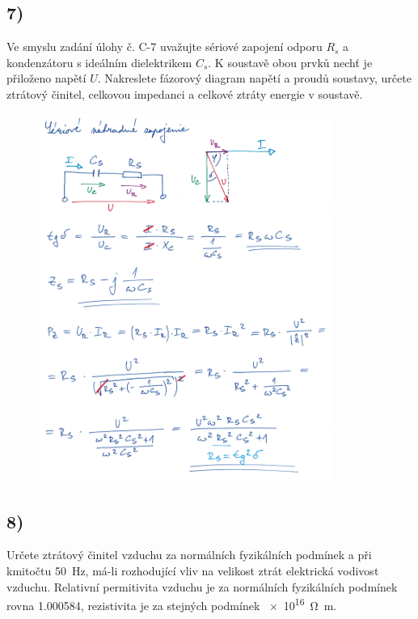 \newpage


\subsection*{7)}
Ve smyslu zadání úlohy č. C-7 uvažujte sériové zapojení odporu $R_s$ a kondenzátoru s ideálním dielektrikem $C_s$. K soustavě obou prvků nechť je přiloženo napětí $U$. Nakreslete fázorový diagram napětí a proudů soustavy, určete ztrátový činitel, celkovou impedanci a celkové ztráty energie v soustavě.

\begin{figure}[h]
    \centering
    \includegraphics*[width=0.85\textwidth]{images/diel7.jpg}
\end{figure}

\newpage


\subsection*{8)}
Určete ztrátový činitel vzduchu za normálních fyzikálních podmínek a při kmitočtu \SI{50}{\hertz}, má-li rozhodující vliv na velikost ztrát elektrická vodivost vzduchu. Relativní permitivita vzduchu je za normálních fyzikálních podmínek rovna \SI{1,000584}{}, rezistivita je za stejných podmínek \SI{e16}{\ohm\meter}.

